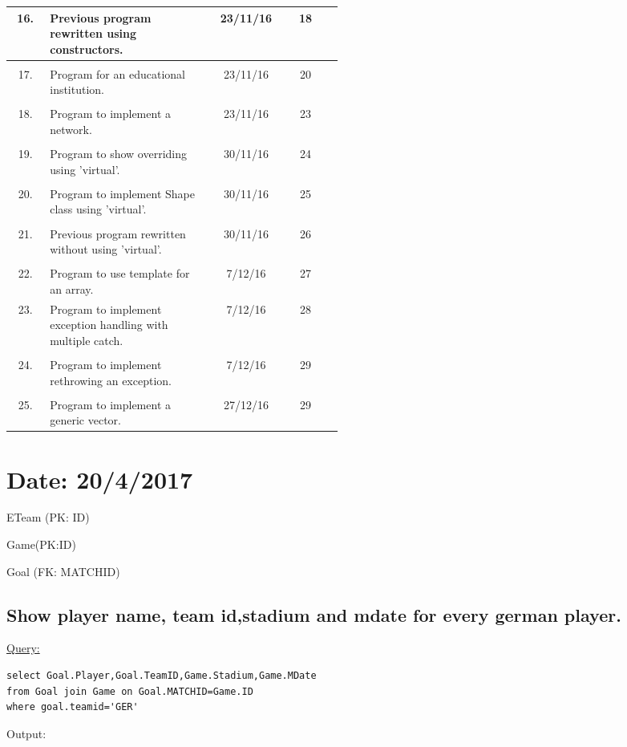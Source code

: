 \documentclass[a4paper,11pt]{article}
\begin{document}
\begin{tabular}{|c|p{0.48\linewidth}|c|c|c|}
\\16.&Previous program rewritten using constructors.& 23/11/16 & 18 &\\ \hline
\\17.&Program for an educational institution.& 23/11/16 & 20 &\\ \hline
\\18.&Program to implement a network.& 23/11/16 & 23 &\\ \hline
\\19.&Program to show overriding using 'virtual'.& 30/11/16 & 24 &\\ \hline
\\20.&Program to implement Shape class using 'virtual'.& 30/11/16 & 25 &\\ \hline
\\21.&Previous program rewritten without using 'virtual'.& 30/11/16 & 26 &\\ \hline
\\22.&Program to use template for an array.& 7/12/16 & 27 &\\ \hline
23.&Program to implement exception handling with multiple catch.& 7/12/16 & 28 &\\ \hline
\\24.&Program to implement rethrowing an exception.& 7/12/16 & 29 &\\ \hline
\\25.&Program to implement a generic vector.& 27/12/16 & 29 &\\ \hline
\end{tabular}

\section{Date: 20/4/2017}

\LARGE{ETeam (PK: ID)}

\bigskip

\bigskip

\large{}
\LARGE{Game(PK:ID)}

\large{}
\LARGE{Goal (FK: MATCHID)}

\subsection{Show player name, team id,stadium and 		mdate for every german player.}
\underline{Query:}
\begin{lstlisting}[showstringspaces=false]
select Goal.Player,Goal.TeamID,Game.Stadium,Game.MDate
from Goal join Game on Goal.MATCHID=Game.ID
where goal.teamid='GER'
\end{lstlisting}
Output:
\begin{figure}[H]
\centering
{}
\end{figure}
\end{document}
